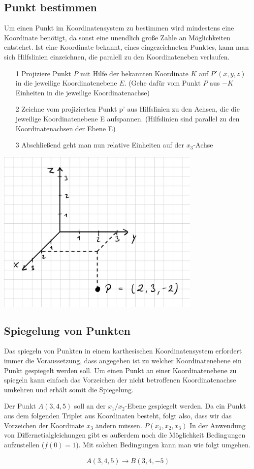 \subsection{Punkt bestimmen}
Um einen Punkt im Koordinatensystem zu bestimmen wird mindestens eine Koordinate benötigt, da sonst eine unendlich große Zahle an Möglichkeiten entstehet. Ist eine Koordinate bekannt, eines eingezeichneten Punktes, kann man sich Hilfslinien einzeichnen, die paralell zu den Koordinateneben verlaufen. 
\begin{itemize}  
\item[1] Projiziere Punkt $P$ mit Hilfe der bekannten Koordinate $K$ auf $P'(x,y,z)$ in die jeweilige Koordinatenebene $E$. (Gehe dafür vom Punkt $P$ aus $-K$ Einheiten in die jeweilige Koordinatenachse)  
\item[2] Zeichne vom projizierten Punkt p' aus Hilfslinien zu den Achsen, die die jeweilige Koordinatenebene E aufspannen. (Hilfslinien sind parallel zu den Koordinatenachsen der Ebene E)   
\item[3] Abschließend geht man nun relative Einheiten auf der $x_3$-Achse   
\end{itemize} 
\includegraphics[width=10cm]{Media/punktablesen3dKoordinatensystem.jpg}
\subsection{Spiegelung von Punkten}
Das spiegeln von Punkten in einem karthesischen Koordinatensystem erfordert immer die Voraussetzung, dass angegeben ist zu welcher Koordinatenebene ein Punkt gespiegelt werden soll. Um einen Punkt an einer Koordinatenebene zu spiegeln kann einfach das Vorzeichen der nicht betroffenen Koordinatenachse umkehren und erhält somit die Spiegelung. 

Der Punkt $A(3,4,5)$ soll an der $x_1/x_2$-Ebene gespiegelt werden. Da ein Punkt 
aus dem folgenden Triplet aus Koordinaten besteht, folgt also, dass wir das
Vorzeichen der Koordinate $x_3$ ändern müssen. 
$P(x_1,x_2,x_3)$
In der Anwendung von Differnetialgleichungen gibt es außerdem noch die
Möglichkeit Bedingungen aufzustellen ($f(0)=1$). Mit solchen Bedingungen kann
man wie folgt umgehen.

\begin{beispiel}
\begin{align*}
	A(3,4,5) \rightarrow B(3,4,-5)
\end{align*}
\end{beispiel}


